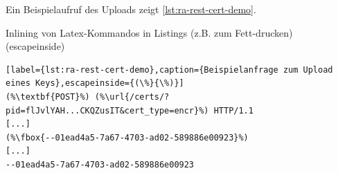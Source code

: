 Ein Beispielaufruf des Uploads zeigt \vref{lst:ra-rest-cert-demo}.

\begin{formal}
	Inlining von Latex-Kommandos in Listings (z.B. zum Fett-drucken) (escapeinside)
\end{formal}
\begin{minipage}[t]{\textwidth}
	\begin{lstlisting}[label={lst:ra-rest-cert-demo},caption={Beispielanfrage zum Upload eines Keys},escapeinside={(\%}{\%)}]
(%\textbf{POST}%) (%\url{/certs/?pid=flJvlYAH...CKQZusIT&cert_type=encr}%) HTTP/1.1
[...]
(%\fbox{--01ead4a5-7a67-4703-ad02-589886e00923}%)
[...]
--01ead4a5-7a67-4703-ad02-589886e00923
	\end{lstlisting}
\end{minipage}